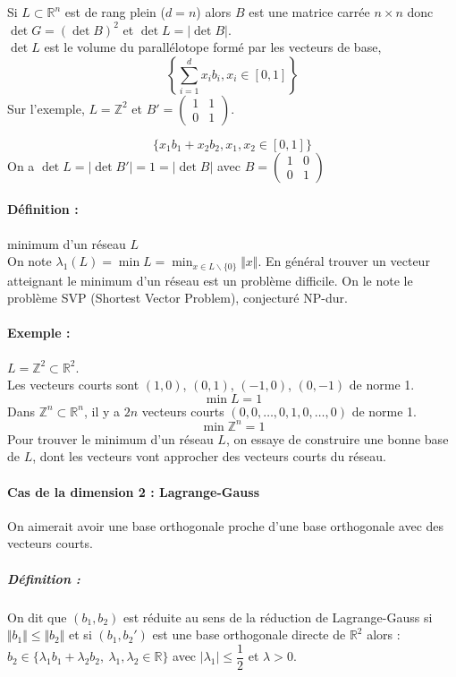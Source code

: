 \documentclass[12pt,a4paper]{report}
\begin{document}
Si $L \subset \mathbb{R}^n$ est de rang plein ($d=n$) alors $B$ est une matrice carrée $n\times n$ donc $\det G = (\det B)^2$ et $\det L = |\det B|$.\\

$\det L$ est le volume du parallélotope formé par les vecteurs de base, $$\left\{ \displaystyle \sum_{i=1}^d x_ib_i, x_i \in [0,1]\right\}$$
Sur l'exemple, $L = \mathbb{Z}^2$ et $B'=\left(\begin{array}{cc} 1 & 1 \\ 0 & 1 \end{array}\right)$.
\begin{center}
  \scalebox{0.8}{}	
\end{center}
$$ \{x_1b_1 + x_2b_2, x_1,x_2 \in [0,1]\} $$
On a $\det L = |\det B'| = 1 = | \det B |$ avec $B=\left(\begin{array}{cc} 1 & 0 \\ 0 & 1 \end{array}\right)$
\begin{center}
  \scalebox{0.8}{}	
\end{center}
\paragraph{Définition :} minimum d'un réseau $L$\\
On note $\lambda_1(L) = \min L = \min_{x\in L\backslash \{0\}} \Vert x \Vert $. En général trouver un vecteur atteignant le minimum d'un réseau est un problème difficile. On le note le problème SVP (Shortest Vector Problem), conjecturé NP-dur.
\paragraph{Exemple :} $L = \mathbb{Z}^2 \subset \mathbb{R}^2 $. \\
Les vecteurs courts sont $(1,0)$, $(0,1)$, $(-1,0)$, $(0,-1)$ de norme 1.
$$ \min L =1 $$
Dans $\mathbb{Z}^n \subset \mathbb{R}^n$, il y a $2n$ vecteurs courts $(0,0, \ldots, 0,1,0,\ldots,0)$ de norme 1.
$$ \min \mathbb{Z}^n = 1$$
Pour trouver le minimum d'un réseau $L$, on essaye de construire une bonne base de $L$, dont les vecteurs vont approcher des vecteurs courts du réseau.
\paragraph{Cas de la dimension 2 : Lagrange-Gauss\\}
On aimerait avoir une base orthogonale proche d'une base orthogonale avec des vecteurs courts. 
\subparagraph{Définition :} On dit que $(b_1,b_2)$ est réduite au sens de la réduction de Lagrange-Gauss si $\Vert b_1 \Vert \leqslant \Vert b_2 \Vert $ et si $(b_1,b_2')$ est une base orthogonale directe de $\mathbb{R}^2$ alors :
$b_2 \in \{\lambda_1 b_1 + \lambda_2 b_2,\ \lambda_1,\lambda_2 \in \mathbb{R}\}$ avec $|\lambda_1 | \leqslant \dfrac{1}{2} $ et $ \lambda > 0 $.
\begin{center}
  \scalebox{0.8}{}	
\end{center}
\end{document}
